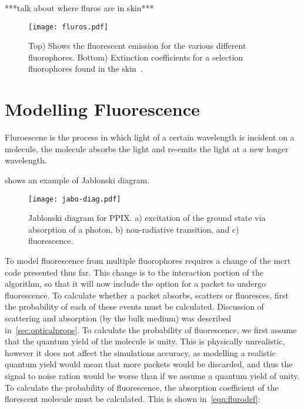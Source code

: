***talk about where fluros are in skin***


\begin{figure}[!htbp]
  \centering
  \texttt{[image: fluros.pdf]}
  \caption{Top) Shows the fluorescent emission for the various different fluorophores. Bottom) Extinction coefficients for a selection fluorophores found in the skin~\cite{prahltyro,prahltryto,soltani2019deep,sun2012biomarkers,islam2013ph,evans2013magnetic,von2012fluorescence}.}
  \label{fig:flurosshow}
\end{figure}
\FloatBarrier

\section{Modelling Fluorescence}

Fluroescene is the process in which light of a certain wavelength is incident on a molecule, the molecule absorbs the light and re-emits the light at a new longer wavelength.

 shows an example of Jablonski diagram.

\begin{figure}[!htpb]
	\centering
	\texttt{[image: jabo-diag.pdf]}
	\caption{Jablonski diagram for PPIX. a) excitation of the ground state via absorption of a photon, b) non-radiative transition, and c) fluorescence.}
	\label{fig:Jabo}
\end{figure}

To model fluorescence from multiple fluorophores requires a change of the \gls*{mcrt} code presented thus far.
This change is to the interaction portion of the algorithm, so that it will now include the option for a packet to undergo fluorescence.
To calculate whether a packet absorbs, scatters or fluoresces, first the probability of each of these events must be calculated.
Discussion of scattering and absorption (by the bulk medium) was described in~\cref{sec:opticalprops}.
To calculate the probability of fluorescence, we first assume that the quantum yield of the molecule is unity.
This is physically unrealistic, however it does not affect the simulations accuracy, as modelling a realistic quantum yield would mean that more packets would be discarded, and thus the signal to noise ration would be worse than if we assume a quantum yield of unity.
To calculate the probability of fluorescence, the absorption coefficient of the florescent molecule must be calculated.
This is shown in~\cref{eqn:flurodef}:

